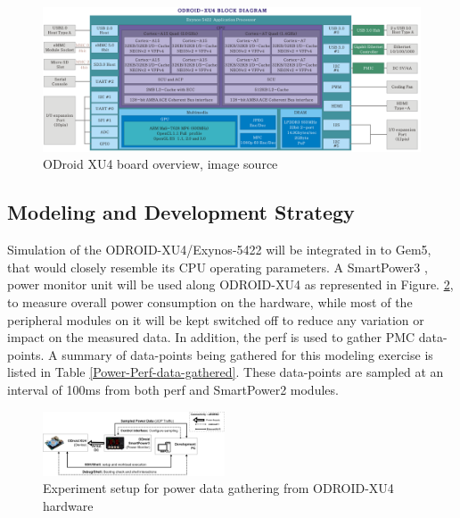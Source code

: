\documentclass[conference]{IEEEtran}
\begin{document}
    \begin{figure}[bh]
        \includegraphics{rsrc/201506191222574523.png}
        \caption{ODroid XU4 board overview, image source\cite{odroid-xu4}}
        \label{fig-odroid-hwoverview}
    \end{figure}

    \subsection{Modeling and Development Strategy}
        \par Simulation of the ODROID-XU4/Exynos-5422 will be integrated in to Gem5, that would closely resemble its CPU operating parameters. A SmartPower3 \cite{odroid-smartpower3}, power monitor unit will be used along ODROID-XU4 as represented in Figure. \ref{fig-Experiment-setup}, to measure overall power consumption on the hardware, while most of the peripheral modules on it will be kept switched off to reduce any variation or impact on the measured data. In addition, the perf\cite{2015137} is used to gather PMC data-points. A summary of data-points being gathered for this modeling exercise is listed in Table \ref{Power-Perf-data-gathered}. These data-points are sampled at an interval of 100ms from both perf and SmartPower2 modules.

        \begin{figure}[t]
            \centering
            \includegraphics[width=0.48\textwidth]{rsrc/Experiment-setup.drawio.png}
            \caption{Experiment setup for power data gathering from ODROID-XU4\cite{odroid-xu4} hardware}
            \label{fig-Experiment-setup}
        \end{figure}
\end{document}
